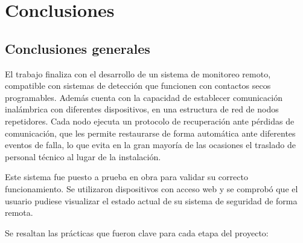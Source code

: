 
\chapter{Conclusiones} %

\label{Chapter5} %




\section{Conclusiones generales }

El trabajo finaliza con el desarrollo de un sistema de monitoreo remoto, compatible con sistemas de detección que funcionen con contactos secos programables. Además cuenta con la capacidad de establecer comunicación inalámbrica con diferentes dispositivos, en una estructura de red de nodos repetidores. Cada nodo ejecuta un protocolo de recuperación ante pérdidas de comunicación, que les permite restaurarse de forma automática ante diferentes eventos de falla, lo que evita en la gran mayoría de las ocasiones el traslado de personal técnico al lugar de la instalación. 

Este sistema fue puesto a prueba en obra para validar su correcto funcionamiento. Se utilizaron dispositivos con acceso web y se comprobó que el usuario pudiese visualizar el estado actual  de su sistema de seguridad de forma remota. 

Se resaltan las prácticas que fueron clave para cada etapa del proyecto:

